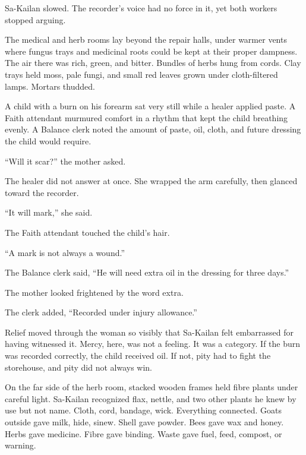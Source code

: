 Sa-Kailan slowed.
The recorder’s voice had no force in it, yet both workers stopped arguing.\par

The medical and herb rooms lay beyond the repair halls, under warmer vents where fungus trays and medicinal roots could be kept at their proper dampness.
The air there was rich, green, and bitter.
Bundles of herbs hung from cords.
Clay trays held moss, pale fungi, and small red leaves grown under cloth-filtered lamps.
Mortars thudded.\par

A child with a burn on his forearm sat very still while a healer applied paste.
A Faith attendant murmured comfort in a rhythm that kept the child breathing evenly.
A Balance clerk noted the amount of paste, oil, cloth, and future dressing the child would require.\par

“Will it scar?” the mother asked.\par

The healer did not answer at once.
She wrapped the arm carefully, then glanced toward the recorder.\par

“It will mark,” she said.\par

The Faith attendant touched the child’s hair.\par

“A mark is not always a wound.”\par

The Balance clerk said, “He will need extra oil in the dressing for three days.”\par

The mother looked frightened by the word extra.\par

The clerk added, “Recorded under injury allowance.”\par

Relief moved through the woman so visibly that Sa-Kailan felt embarrassed for having witnessed it.
Mercy, here, was not a feeling.
It was a category.
If the burn was recorded correctly, the child received oil.
If not, pity had to fight the storehouse, and pity did not always win.\par

On the far side of the herb room, stacked wooden frames held fibre plants under careful light.
Sa-Kailan recognized flax, nettle, and two other plants he knew by use but not name.
Cloth, cord, bandage, wick.
Everything connected.
Goats outside gave milk, hide, sinew.
Shell gave powder.
Bees gave wax and honey.
Herbs gave medicine.
Fibre gave binding.
Waste gave fuel, feed, compost, or warning.\par


